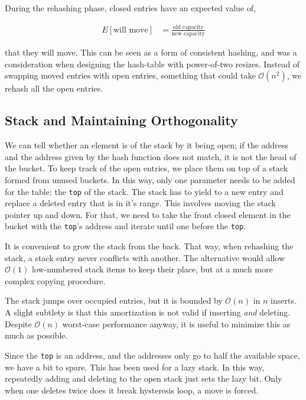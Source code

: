 \documentclass[12pt]{article}
\newcommand{\code}[1]{\colorbox{light-gray}{\texttt{#1}}}
\begin{document}
During the rehashing phase, closed entries have an expected value of,

\begin{align*}
E[\text{will move}] &= \frac{\text{old capacity}}{\text{new capacity}}
\end{align*}

that they will move. This can be seen as a form of consistent hashing\cite{karger1997consistent}, and was a consideration when designing the hash-table with power-of-two resizes. Instead of swapping moved entries with open entries, something that could take $\mathcal{O}(n^2)$, we rehash all the open entries.

\subsection{Stack and Maintaining Orthogonality}

We can tell whether an element is of the stack by it being open; if the address and the address given by the hash function does not match, it is not the head of the bucket. To keep track of the open entries, we place them on top of a stack formed from unused buckets. In this way, only one parameter needs to be added for the table: the \code{top} of the stack. The stack has to yield to a new entry and replace a deleted entry that is in it's range. This involves moving the stack pointer up and down. For that, we need to take the front closed element in the bucket with the \code{top}'s address and iterate until one before the \code{top}.

It is convenient to grow the stack from the back. That way, when rehashing the stack, a stack entry never conflicts with another. The alternative would allow $\mathcal{O}(1)$ low-numbered stack items to keep their place, but at a much more complex copying procedure.

The stack jumps over occupied entries, but it is bounded by $\mathcal{O}(n)$ in $n$ inserts. A slight subtlety is that this amortization is not valid if inserting {\it and} deleting. Despite $\mathcal{O}(n)$ worst-case performance anyway, it is useful to minimize this as much as possible.

Since the \code{top} is an address, and the addresses only go to half the available space, we have a bit to spare. This has been used for a lazy stack. In this way, repeatedly adding and deleting to the open stack just sets the lazy bit. Only when one deletes twice does it break hysteresis loop, a move is forced.
\end{document}
